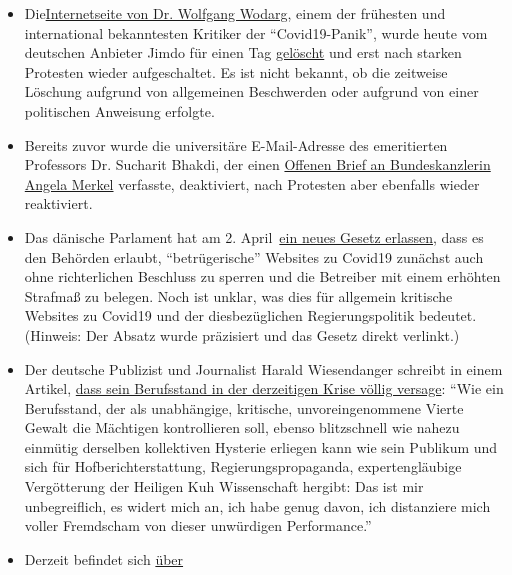 \begin{itemize}
\tightlist
\item
  Die\href{http://wodarg.com}{Internetseite von Dr. Wolfgang Wodarg},
  einem der frühesten und international bekanntesten Kritiker der
  ``Covid19-Panik'', wurde heute vom deutschen Anbieter Jimdo für einen
  Tag \href{https://twitter.com/wodarg}{gelöscht} und erst nach starken
  Protesten wieder aufgeschaltet. Es ist nicht bekannt, ob die zeitweise
  Löschung aufgrund von allgemeinen Beschwerden oder aufgrund von einer
  politischen Anweisung erfolgte.
\item
  Bereits zuvor wurde die universitäre E-Mail-Adresse des emeritierten
  Professors Dr. Sucharit Bhakdi, der einen
  \href{https://swprs.org/offener-brief-von-professor-sucharit-bhakdi-an-bundeskanzlerin-dr-angela-merkel/}{Offenen
  Brief an Bundeskanzlerin Angela Merkel} verfasste, deaktiviert, nach
  Protesten aber ebenfalls wieder reaktiviert.
\item
  Das dänische Parlament hat am 2.
  April~\href{https://www.ft.dk/ripdf/samling/20191/lovforslag/l157/20191_l157_som_vedtaget.pdf}{ein
  neues Gesetz erlassen}, dass es den Behörden erlaubt,
  ``betrügerische'' Websites zu Covid19 zunächst auch ohne richterlichen
  Beschluss zu sperren und die Betreiber mit einem erhöhten Strafmaß zu
  belegen. Noch ist unklar, was dies für allgemein kritische Websites zu
  Covid19 und der diesbezüglichen Regierungs­politik bedeutet. (Hinweis:
  Der Absatz wurde präzisiert und das Gesetz direkt verlinkt.)
\item
  Der deutsche Publizist und Journalist Harald Wiesendanger schreibt in
  einem Artikel,
  \href{https://www.nachrichten-fabrik.de/news/harald-wiesendanger-ueber-die-massenmedien-waehrend-der-corona-krise-ich-schaeme-mich---meines-berufsstands-152103}{dass
  sein Berufsstand in der derzeitigen Krise völlig versage}: ``Wie ein
  Berufsstand, der als unabhängige, kritische, unvoreingenommene Vierte
  Gewalt die Mächtigen kontrollieren soll, ebenso blitzschnell wie
  nahezu einmütig derselben kollektiven Hysterie erliegen kann wie sein
  Publikum und sich für Hofberichterstattung, Regierungspropaganda,
  expertengläubige Vergöt­te­rung der Heiligen Kuh Wissenschaft hergibt:
  Das ist mir unbegreiflich, es widert mich an, ich habe genug davon,
  ich distanziere mich voller Fremdscham von dieser unwürdigen
  Performance.''
\item
  Derzeit befindet sich
  \href{https://www.sciencealert.com/one-third-of-the-world-s-population-are-now-restricted-in-where-they-can-go}{über
}
\end{itemize}
